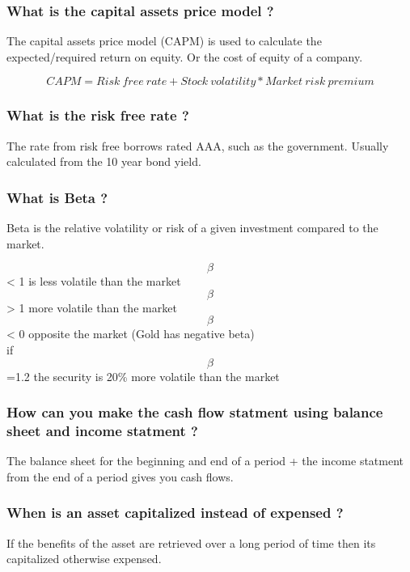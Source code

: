 \documentclass[11pt]{scrartcl} %
\begin{document}
\subsubsection{What is the capital assets price model ?}

The capital assets price model (CAPM) is used to calculate the expected/required return on equity. Or the cost of equity of a company.

\[ CAPM = Risk\:free\:rate + Stock\:volatility*Market\:risk\:premium \]

\subsubsection{What is the risk free rate ?}

The rate from risk free borrows rated AAA, such as the government. Usually calculated from the 10 year bond yield.

\subsubsection{What is Beta ?}

Beta is the relative volatility or risk of a given investment compared to the market.

\[ \beta \] < 1 is less volatile than the market \\
\[ \beta \] > 1 more volatile than the market \\
\[ \beta \] < 0 opposite the market (Gold has negative beta) \\

if \[ \beta \]=1.2 the security is 20\% more volatile than the market

\subsubsection{How can you make the cash flow statment using balance sheet and income statment ?}

The balance sheet for the beginning and end of a period + the income statment from the end of a period gives you cash flows.

\subsubsection{When is an asset capitalized instead of expensed ?}

If the benefits of the asset are retrieved over a long period of time then its capitalized otherwise expensed.
\end{document}
